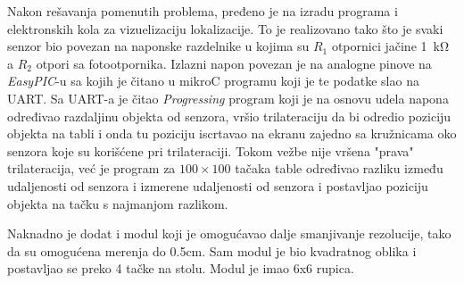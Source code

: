 \documentclass{article}
\begin{document}
    Nakon rešavanja pomenutih problema, pređeno je na izradu programa i elektronskih kola za vizuelizaciju lokalizacije. To je realizovano tako što je svaki senzor bio povezan na naponske razdelnike u kojima su $R_1$ otpornici jačine \SI{1}{\kilo\ohm} a $R_2$ otpori sa fotootpornika. Izlazni napon povezan je na analogne pinove na \textit{EasyPIC}-u sa kojih je čitano u mikroC programu koji je te podatke slao na UART. Sa UART-a je čitao \textit{Progressing} program koji je na osnovu udela napona određivao razdaljinu objekta od senzora, vršio trilateraciju da bi odredio poziciju objekta na tabli i onda tu poziciju iscrtavao na ekranu zajedno sa kružnicama oko senzora koje su korišćene pri trilateraciji. Tokom vežbe nije vršena "prava" trilateracija, već je program za $100\times100$ tačaka table određivao razliku između udaljenosti od senzora i izmerene udaljenosti od senzora i postavljao poziciju objekta na tačku s najmanjom razlikom.

    Naknadno je dodat i modul koji je omogućavao dalje smanjivanje rezolucije, tako da su omogućena merenja do 0.5cm. Sam modul je bio kvadratnog oblika i postavljao se preko 4 tačke na stolu. Modul je imao 6x6 rupica.
\end{document}
